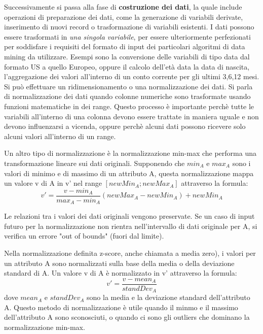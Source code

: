 \documentclass[a4paper]{extarticle}
\begin{document}
Successivamente si passa alla fase di \textbf{costruzione dei dati}, la quale include operazioni di preparazione dei dati, come la generazione di variabili derivate, inserimento di nuovi record o trasformazione di variabili esistenti. I dati possono essere trasformati in \textit{una singola variabile}, per essere ulteriormente perfezionati per soddisfare i requisiti del formato di input dei particolari algoritmi di data mining da utilizzare. Esempi sono la conversione delle variabili di tipo data dal formato US a quello Europeo, oppure il calcolo dell'età data la data di nascita, l'aggregazione dei valori all'interno di un conto corrente per gli ultimi 3,6,12 mesi. Si può effettuare un ridimensionamento o una normalizzazione dei dati. Si parla di normalizzazione dei dati quando colonne numeriche sono trasformate usando funzioni matematiche in dei range. Questo processo è importante perchè tutte le variabili all'interno di una colonna devono essere trattate in maniera uguale e non devono influenzarsi a vicenda, oppure perchè alcuni dati possono ricevere solo alcuni valori all'interno di un range.

Un altro tipo di normalizzazione è la normalizzazione min-max che performa una transformazione lineare sui dati originali. Supponendo che $ min_A$ e $max_A$ sono i valori di minimo e di massimo di un attributo A, questa normalizzazione mappa un valore v di A in v' nel range $[newMin_A; newMax_A]$ attraverso la formula:
\begin{equation}
v'= \frac{v-min_A}{max_A-min_A}(newMax_A - newMin_A)+newMin_A
\end{equation}

Le relazioni tra i valori dei dati originali vengono preservate. Se un caso di input futuro per la normalizzazione non rientra nell'intervallo di dati originale per A, si verifica un errore "out of bounds" (fuori dal limite).

Nella normalizzazione definita z-score, anche chiamata a media zero), i valori per un attributo A sono normalizzati sulla base della media o della deviazione standard di A. Un valore v di A è normalizzato in v' attraverso la formula:
\begin{equation}
v'=\frac{v-mean_A}{standDev_A}
\end{equation}
dove $mean_A$ e $standDev_A$ sono la media e la deviazione standard dell'attributo A. Questo metodo di normalizzazione è utile quando il minmo e il massimo dell'attributo A sono sconosciuti, o quando ci sono gli outliers che dominano la normalizzazione min-max.
\end{document}
